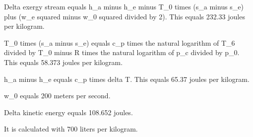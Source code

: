 Delta exergy stream equals h_a minus h_e minus T_0 times (s_a minus s_e) plus (w_e squared minus w_0 squared divided by 2). This equals 232.33 joules per kilogram.  

T_0 times (s_a minus s_e) equals c_p times the natural logarithm of T_6 divided by T_0 minus R times the natural logarithm of p_c divided by p_0. This equals 58.373 joules per kilogram.  

h_a minus h_e equals c_p times delta T. This equals 65.37 joules per kilogram.  

w_0 equals 200 meters per second.  

Delta kinetic energy equals 108.652 joules.  

It is calculated with 700 liters per kilogram.